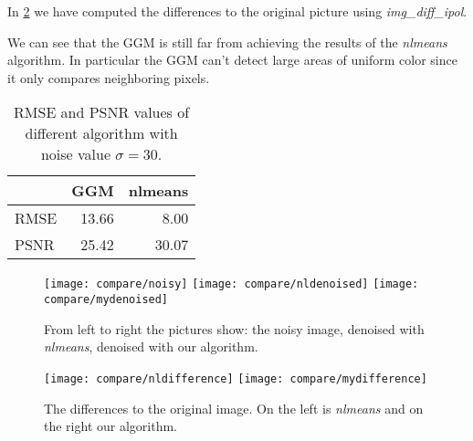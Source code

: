 \documentclass[12pt]{scrartcl}
\begin{document}
In \cref{fig:diff} we have computed the differences to the original picture using \emph{img\_diff\_ipol}.

We can see that the GGM is still far from achieving the results of the \emph{nlmeans} algorithm. In particular the GGM can't detect large areas of uniform color since it only compares neighboring pixels.

\begin{table}
  \centering
  \caption{RMSE and PSNR values of different algorithm with noise value $\sigma=30$.}
  \begin{tabular}{l | r | r}
          & GGM   & nlmeans \\
    \hline
    RMSE  & 13.66 & 8.00    \\
    PSNR  & 25.42 & 30.07
  \end{tabular}
  \label{tab:rmse}
\end{table}

\begin{figure}[h]
  \centering
  \texttt{[image: compare/noisy]}
  \texttt{[image: compare/nldenoised]}
  \texttt{[image: compare/mydenoised]}
  \caption{From left to right the pictures show: the noisy image, denoised with \emph{nlmeans}, denoised with our algorithm.}
  \label{fig:den}
\end{figure}

\begin{figure}[h]
  \centering
  \texttt{[image: compare/nldifference]}
  \texttt{[image: compare/mydifference]}
  \caption{The differences to the original image. On the left is \emph{nlmeans} and on the right our algorithm.}
  \label{fig:diff}
\end{figure}



\clearpage

\end{document}
